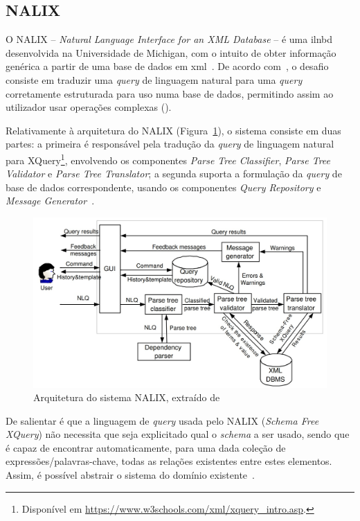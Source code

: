 \subsection{NALIX}
O NALIX -- \textit{Natural Language Interface for an XML Database} -- é uma \gls{ilnbd} desenvolvida na Universidade de Michigan, com o intuito de obter informação genérica a partir de uma base de dados em \gls{xml}~\parencite{nalix_interactive_nli_querying_xml}. De acordo com~\textcite{nalix_interactive_nli_querying_xml}, o desafio consiste em traduzir uma \textit{query} de linguagem natural para uma \textit{query} corretamente estruturada para uso numa base de dados, permitindo assim ao utilizador usar operações complexas ().

Relativamente à arquitetura do NALIX (Figura~\ref{fig:nalix_architecture}), o sistema consiste em duas partes: a primeira é responsável pela tradução da \textit{query} de linguagem natural para XQuery\footnote{Disponível em \url{https://www.w3schools.com/xml/xquery_intro.asp}.}, envolvendo os componentes \textit{Parse Tree Classifier}, \textit{Parse Tree Validator} e \textit{Parse Tree Translator}; a segunda suporta a formulação da \textit{query} de base de dados correspondente, usando os componentes \textit{Query Repository} e \textit{Message Generator}~\parencite{nalix_interactive_nli_querying_xml}.

\begin{figure}[!ht]
    \centering
    \includegraphics[width=.74\textwidth]{ch03/assets/nalix_architecture.jpg}
    \caption{Arquitetura do sistema NALIX, extraído de~\textcite{nalix_interactive_nli_querying_xml}}
    \label{fig:nalix_architecture}
\end{figure}

De salientar é que a linguagem de \textit{query} usada pelo NALIX (\textit{Schema Free XQuery}) não necessita que seja explicitado qual o \textit{schema} a ser usado, sendo que é capaz de encontrar automaticamente, para uma dada coleção de expressões/palavras-chave, todas as relações existentes entre estes elementos. Assim, é possível abstrair o sistema do domínio existente~\parencite{nalix_interactive_nli_querying_xml, survey_nlidb}.

